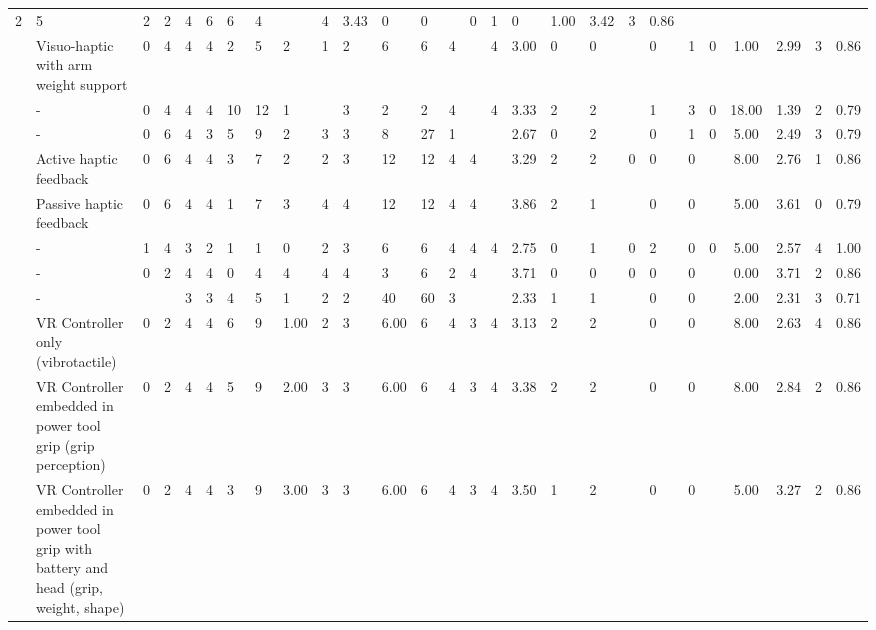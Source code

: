 \begin{table}[htbp]
\begin{tabular}{lp{4cm}lllllllllllllllllllllcccc}
  2 &
  5 &
  2 &
  2 &
  4 &
  6 &
  6 &
  4 &
   &
  4\footnotemark[44] &
  3.43 &
  0 &
  0 &
   &
  0 &
  1 &
  0 &
  1.00 &
  3.42 &
  3 &
  0.86 \\
\cite{Oezen2022} &
  Visuo-haptic with arm weight support &
  0 &
  4 &
  4 &
  4 &
  2 &
  5 &
  2 &
  1 &
  2 &
  6 &
  6 &
  4 &
   &
  4\footnotemark[44] &
  3.00 &
  0 &
  0 &
   &
  0 &
  1 &
  0 &
  1.00 &
  2.99 &
  3 &
  0.86 \\
\cite{Perez2023} &
  - &
  0 &
  4 &
  4 &
  4 &
  10 &
  12 &
  1 &
   &
  3 &
  2 &
  2 &
  4 &
   &
  4 &
  3.33 &
  2 &
  2 &
   &
  1 &
  3 &
  0 &
  18.00 &
  1.39 &
  2 &
  0.79 \\
\cite{Trinitatova2023} &
  - &
  0 &
  6 &
  4 &
  3 &
  5 &
  9 &
  2 &
  3 &
  3 &
  8 &
  27 &
  1 &
   &
   &
  2.67 &
  0 &
  2 &
   &
  0 &
  1 &
  0 &
  5.00 &
  2.49 &
  3 &
  0.79 \\
\cite{Vaghela2021} &
  Active haptic feedback &
  0 &
  6 &
  4 &
  4 &
  3 &
  7 &
  2 &
  2 &
  3 &
  12 &
  12 &
  4 &
  4 &
   &
  3.29 &
  2 &
  2 &
  0 &
  0 &
  0 &
   &
  8.00 &
  2.76 &
  1 &
  0.86 \\
\cite{Vaghela2021} &
  Passive haptic feedback &
  0 &
  6 &
  4 &
  4 &
  1 &
  7 &
  3 &
  4 &
  4 &
  12 &
  12 &
  4 &
  4 &
   &
  3.86 &
  2 &
  1 &
   &
  0 &
  0 &
   &
  5.00 &
  3.61 &
  0 &
  0.79 \\
\cite{Vasudevan2020} &
  - &
  1 &
  4 &
  3 &
  2 &
  1 &
  1 &
  0 &
  2 &
  3 &
  6 &
  6 &
  4 &
  4 &
  4 &
  2.75 &
  0 &
  1 &
  0 &
  2 &
  0 &
  0 &
  5.00 &
  2.57 &
  4 &
  1.00 \\
\cite{Wall2000} &
  - &
  0 &
  2 &
  4 &
  4 &
  0 &
  4 &
  4 &
  4 &
  4 &
  3 &
  6 &
  2 &
  4 &
   &
  3.71 &
  0 &
  0 &
  0 &
  0 &
  0 &
   &
  0.00 &
  3.71 &
  2 &
  0.86 \\
\cite{Xia2023} &
  - &
   &
   &
  3\footnotemark[45]&
  3\footnotemark[46] &
  4\footnotemark[47] &
  5 &
  1 &
  2\footnotemark[48] &
  2 &
  40 &
  60\footnotemark[49] &
  3 &
   &
   &
  2.33 &
  1 &
  1\footnotemark[50] &
   &
  0 &
  0 &
   &
  2.00 &
  2.31 &
  3 &
  0.71 \\
\cite{Yang2023} &
  VR Controller only (vibrotactile) &
  0 &
  2 &
  4 &
  4 &
  6 &
  9 &
  1.00 &
  2 &
  3 &
  6.00 &
  6 &
  4 &
  3 &
  4\footnotemark[51] &
  3.13 &
  2 &
  2 &
   &
  0 &
  0 &
   &
  8.00 &
  2.63 &
  4 &
  0.86 \\
\cite{Yang2023} &
  VR Controller embedded in power tool grip (grip perception) &
  0 &
  2 &
  4 &
  4 &
  5 &
  9 &
  2.00 &
  3 &
  3 &
  6.00 &
  6 &
  4 &
  3 &
  4\footnotemark[51] &
  3.38 &
  2 &
  2 &
   &
  0 &
  0 &
   &
  8.00 &
  2.84 &
  2 &
  0.86 \\
\cite{Yang2023} &
  VR Controller embedded in power tool grip with battery and   head (grip, weight, shape) &
  0 &
  2 &
  4 &
  4 &
  3 &
  9 &
  3.00 &
  3 &
  3 &
  6.00 &
  6 &
  4 &
  3 &
  4\footnotemark[51] &
  3.50 &
  1\footnotemark[52] &
  2 &
   &
  0 &
  0 &
   &
  5.00 &
  3.27 &
  2 &
  0.86
\end{tabular}
\end{table}
